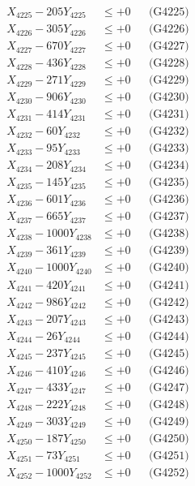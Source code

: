 \documentclass[a4paper,10pt]{article}
\begin{document}
{\begin{align}
X_{4225} - 205Y_{4225} &\leq +0 && \text{(G4225)} \\
X_{4226} - 305Y_{4226} &\leq +0 && \text{(G4226)} \\
X_{4227} - 670Y_{4227} &\leq +0 && \text{(G4227)} \\
X_{4228} - 436Y_{4228} &\leq +0 && \text{(G4228)} \\
X_{4229} - 271Y_{4229} &\leq +0 && \text{(G4229)} \\
X_{4230} - 906Y_{4230} &\leq +0 && \text{(G4230)} \\
\allowbreak
X_{4231} - 414Y_{4231} &\leq +0 && \text{(G4231)} \\
X_{4232} - 60Y_{4232} &\leq +0 && \text{(G4232)} \\
X_{4233} - 95Y_{4233} &\leq +0 && \text{(G4233)} \\
X_{4234} - 208Y_{4234} &\leq +0 && \text{(G4234)} \\
X_{4235} - 145Y_{4235} &\leq +0 && \text{(G4235)} \\
X_{4236} - 601Y_{4236} &\leq +0 && \text{(G4236)} \\
X_{4237} - 665Y_{4237} &\leq +0 && \text{(G4237)} \\
X_{4238} - 1000Y_{4238} &\leq +0 && \text{(G4238)} \\
X_{4239} - 361Y_{4239} &\leq +0 && \text{(G4239)} \\
X_{4240} - 1000Y_{4240} &\leq +0 && \text{(G4240)} \\
\allowbreak
X_{4241} - 420Y_{4241} &\leq +0 && \text{(G4241)} \\
X_{4242} - 986Y_{4242} &\leq +0 && \text{(G4242)} \\
X_{4243} - 207Y_{4243} &\leq +0 && \text{(G4243)} \\
X_{4244} - 26Y_{4244} &\leq +0 && \text{(G4244)} \\
X_{4245} - 237Y_{4245} &\leq +0 && \text{(G4245)} \\
X_{4246} - 410Y_{4246} &\leq +0 && \text{(G4246)} \\
X_{4247} - 433Y_{4247} &\leq +0 && \text{(G4247)} \\
X_{4248} - 222Y_{4248} &\leq +0 && \text{(G4248)} \\
X_{4249} - 303Y_{4249} &\leq +0 && \text{(G4249)} \\
X_{4250} - 187Y_{4250} &\leq +0 && \text{(G4250)} \\
\allowbreak
X_{4251} - 73Y_{4251} &\leq +0 && \text{(G4251)} \\
X_{4252} - 1000Y_{4252} &\leq +0 && \text{(G4252)} \\

\end{align}}
\end{document}
